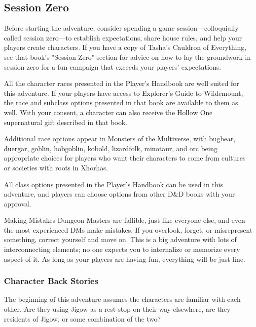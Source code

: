 \documentclass[10pt,a4paper,twoside,twocolumn,openany,nodeprecatedcode]{dndbook}
\begin{document}
\subsection{Session Zero}
Before starting the adventure, consider spending a game session—colloquially called session zero—to establish expectations, share house rules, and help your players create characters. If you have a copy of Tasha's Cauldron of Everything, see that book's "Session Zero" section for advice on how to lay the groundwork in session zero for a fun campaign that exceeds your players' expectations.

All the character races presented in the Player's Handbook are well suited for this adventure. If your players have access to Explorer's Guide to Wildemount, the race and subclass options presented in that book are available to them as well. With your consent, a character can also receive the Hollow One supernatural gift described in that book.

Additional race options appear in Monsters of the Multiverse, with bugbear, duergar, goblin, hobgoblin, kobold, lizardfolk, minotaur, and orc being appropriate choices for players who want their characters to come from cultures or societies with roots in Xhorhas.

All class options presented in the Player's Handbook can be used in this adventure, and players can choose options from other D\&D books with your approval.

\begin{DndSidebar}[float=!b]{Making Mistakes}
Dungeon Masters are fallible, just like everyone else, and even the most experienced DMs make mistakes. If you overlook, forget, or misrepresent something, correct yourself and move on. This is a big adventure with lots of interconnecting elements; no one expects you to internalize or memorize every aspect of it. As long as your players are having fun, everything will be just fine.



\end{DndSidebar}

\subsubsection{Character Back Stories}
The beginning of this adventure assumes the characters are familiar with each other. Are they using Jigow as a rest stop on their way elsewhere, are they residents of Jigow, or some combination of the two?
\end{document}
